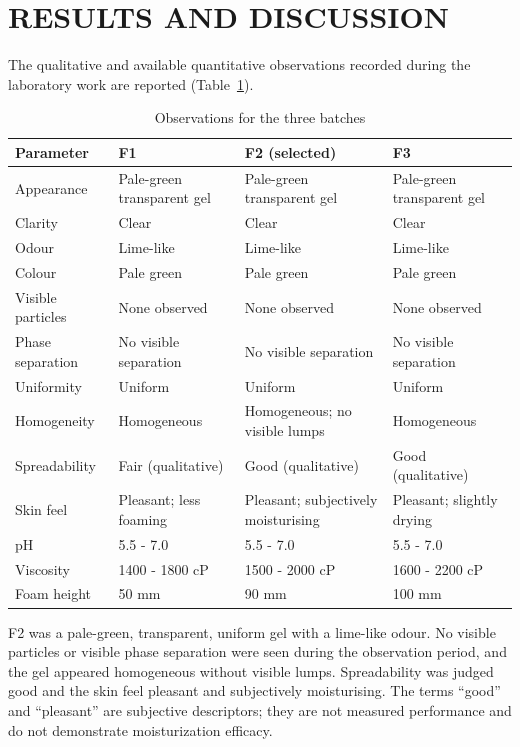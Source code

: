 \documentclass[10pt,a4paper,twocolumn]{article}
\begin{document}
\section{RESULTS AND DISCUSSION}

The qualitative and available quantitative observations recorded during the laboratory work are
reported (Table~\ref{tab:results}).

\begin{table}[!htbp]
\centering

\renewcommand{\arraystretch}{1.3}
\begin{tabularx}{\textwidth}{lXXX}
\toprule
\textbf{Parameter} & \textbf{F1} & \textbf{F2 (selected)} & \textbf{F3} \\
\midrule
Appearance
  & Pale-green transparent gel & Pale-green transparent gel & Pale-green transparent gel \\
Clarity
  & Clear & Clear & Clear \\
Odour
  & Lime-like & Lime-like & Lime-like \\
Colour
  & Pale green & Pale green & Pale green \\
Visible particles
  & None observed & None observed & None observed \\
Phase separation
  & No visible separation & No visible separation & No visible separation \\
Uniformity
  & Uniform & Uniform & Uniform \\
Homogeneity
  & Homogeneous & Homogeneous; no visible lumps & Homogeneous \\
Spreadability
  & Fair (qualitative) & Good (qualitative) & Good (qualitative) \\
Skin feel
  & Pleasant; less foaming & Pleasant; subjectively moisturising & Pleasant; slightly drying \\
pH
  & 5.5 - 7.0 & 5.5 - 7.0 & 5.5 - 7.0 \\
Viscosity
  & 1400 - 1800 cP
  & 1500 - 2000 cP
  & 1600 - 2200 cP \\
Foam height
  & 50 mm & 90 mm & 100 mm \\
\bottomrule
\end{tabularx}
\caption{Observations for the three batches}
\label{tab:results}
\end{table}

F2 was a pale-green, transparent, uniform gel with a lime-like odour. No
visible particles or visible phase separation were seen during the
observation period, and the gel appeared homogeneous without visible
lumps. Spreadability was judged good and the skin feel pleasant and
subjectively moisturising. The terms ``good'' and ``pleasant'' are
subjective descriptors; they are not measured performance and do not
demonstrate moisturization efficacy.
\end{document}

